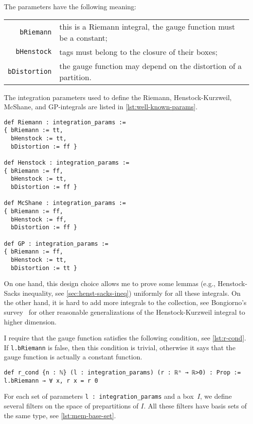 \documentclass[a4paper, UKenglish,cleveref, autoref, thm-restate]{lipics-v2021}
\begin{document}
The parameters have the following meaning:

\noindent%
\begin{tabular}{rp{10cm}}
  \lstinline=bRiemann=&this is a Riemann integral, the gauge function must be a constant;\\
  \lstinline=bHenstock=&tags must belong to the closure of their boxes;\\
  \lstinline=bDistortion=&the gauge function may depend on the distortion of a partition.
\end{tabular}

The integration parameters used to define the Riemann,
Henstock-Kurzweil, McShane, and GP-integrals are listed in
\cref{lst:well-known-params}.

\begin{lstlisting}[caption={Parameters corresponding to well-known integrals},label=lst:well-known-params]
def Riemann : integration_params :=
{ bRiemann := tt,
  bHenstock := tt,
  bDistortion := ff }

def Henstock : integration_params :=
{ bRiemann := ff,
  bHenstock := tt,
  bDistortion := ff }

def McShane : integration_params :=
{ bRiemann := ff,
  bHenstock := ff,
  bDistortion := ff }

def GP : integration_params :=
{ bRiemann := ff,
  bHenstock := tt,
  bDistortion := tt }
\end{lstlisting}

On one hand, this design choice allows me to prove some lemmas (e.g.,
Henstock-Sacks inequality, see \autoref{sec:henst-sacks-ineq})
uniformly for all these integrals. On the other hand, it is hard to
add more integrals to the collection, see Bongiorno's
survey~\cite{BONGIORNO2002587} for other reasonable generalizations of
the Henstock-Kurzweil integral to higher dimension.

I require that the gauge function satisfies the following condition,
see \autoref{lst:r-cond}. If \lstinline=l.bRiemann= is false, then
this condition is trivial, otherwise it says that the gauge function
is actually a constant function.

\begin{lstlisting}[caption={Condition on the gauge function},label=lst:r-cond]
def r_cond {n : ℕ} (l : integration_params) (r : ℝⁿ → ℝ>0) : Prop :=
l.bRiemann → ∀ x, r x = r 0
\end{lstlisting}

For each set of parameters \lstinline=l : integration_params= and a
box~\(I\), we define several filters on the space of prepartitions of
\(I\). All these filters have basis sets of the same type, see
\autoref{lst:mem-base-set}.
\end{document}
